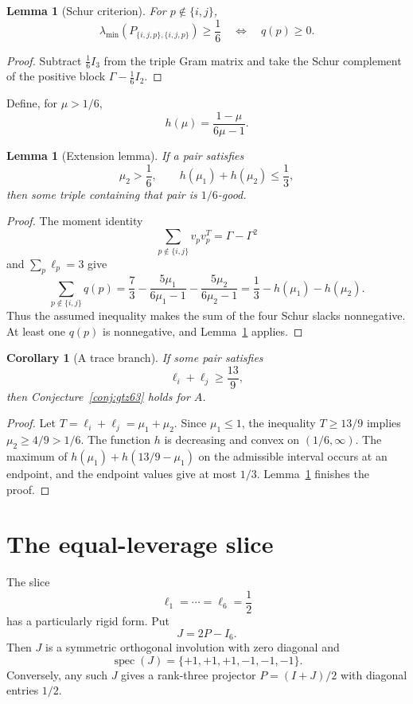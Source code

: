 \documentclass[11pt]{article}
\numberwithin{equation}{section}
\newtheorem{lemma}[theorem]{Lemma}
\newtheorem{corollary}[theorem]{Corollary}
\theoremstyle{definition}
\newcommand{\spec}{\operatorname{spec}}
\newcommand{\lmin}{\lambda_{\min}}
\begin{document}
\begin{lemma}[Schur criterion]\label{lem:schur}
For $p\notin\{i,j\}$,
\[
  \lmin(P_{\{i,j,p\},\{i,j,p\}})\ge\frac16
  \quad\Longleftrightarrow\quad
  q(p)\ge0.
\]
\end{lemma}

\begin{proof}
Subtract $\frac16 I_3$ from the triple Gram matrix and take the Schur
complement of the positive block $\Gamma-\frac16 I_2$.
\end{proof}

Define, for $\mu>1/6$,
\[
  h(\mu)=\frac{1-\mu}{6\mu-1}.
\]

\begin{lemma}[Extension lemma]\label{lem:extension}
If a pair satisfies
\[
  \mu_2>\frac16,\qquad h(\mu_1)+h(\mu_2)\le\frac13,
\]
then some triple containing that pair is $1/6$-good.
\end{lemma}

\begin{proof}
The moment identity
\[
  \sum_{p\notin\{i,j\}} v_pv_p^T=\Gamma-\Gamma^2
\]
and $\sum_p\ell_p=3$ give
\[
  \sum_{p\notin\{i,j\}} q(p)
  =
  \frac73
  -
  \frac{5\mu_1}{6\mu_1-1}
  -
  \frac{5\mu_2}{6\mu_2-1}
  =
  \frac13-h(\mu_1)-h(\mu_2).
\]
Thus the assumed inequality makes the sum of the four Schur slacks nonnegative.
At least one $q(p)$ is nonnegative, and Lemma~\ref{lem:schur} applies.
\end{proof}

\begin{corollary}[A trace branch]\label{cor:trace}
If some pair satisfies
\[
  \ell_i+\ell_j\ge\frac{13}{9},
\]
then Conjecture~\ref{conj:gtz63} holds for $A$.
\end{corollary}

\begin{proof}
Let $T=\ell_i+\ell_j=\mu_1+\mu_2$.  Since $\mu_1\le1$, the inequality
$T\ge13/9$ implies $\mu_2\ge4/9>1/6$.  The function $h$ is decreasing and
convex on $(1/6,\infty)$.  The maximum of
$h(\mu_1)+h(13/9-\mu_1)$ on the admissible interval occurs at an endpoint,
and the endpoint values give at most $1/3$.  Lemma~\ref{lem:extension}
finishes the proof.
\end{proof}

\section{The equal-leverage slice}

The slice
\[
  \ell_1=\cdots=\ell_6=\frac12
\]
has a particularly rigid form.  Put
\[
  J=2P-I_6.
\]
Then $J$ is a symmetric orthogonal involution with zero diagonal and
\[
  \spec(J)=\{+1,+1,+1,-1,-1,-1\}.
\]
Conversely, any such $J$ gives a rank-three projector $P=(I+J)/2$ with
diagonal entries $1/2$.
\end{document}
